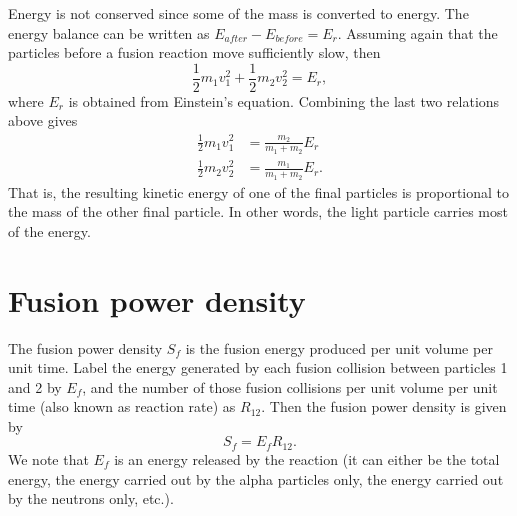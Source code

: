 \documentclass[a4paper,11pt]{report}
\begin{document}
Energy is not conserved since some of the mass is converted to energy. The energy balance can be written as $E_{after} - E_{before} = E_r$. Assuming again that the particles before a fusion reaction move sufficiently slow, then
\begin{equation}
\frac{1}{2} m_1 v_1^2 + \frac{1}{2} m_2 v_2^2 = E_r,
\end{equation}
where $E_r$ is obtained from Einstein's equation. Combining the last two relations above gives
\begin{align}
    \frac{1}{2} m_1 v_1^2 &= \frac{m_2}{m_1 + m_2} E_r \nonumber \\
    \frac{1}{2} m_2 v_2^2 &= \frac{m_1}{m_1 + m_2} E_r.
\end{align}
That is, the resulting kinetic energy of one of the final particles is proportional to the mass of the other final particle. In other words, the light particle carries most of the energy.

\section{Fusion power density}
The fusion power density $S_f$ is the fusion energy produced per unit volume per unit time. Label the energy generated by each fusion collision between particles 1 and 2 by $E_f$, and the number of those fusion collisions per unit volume per unit time (also known as reaction rate) as $R_{12}$. Then the fusion power density is given by 
\begin{equation}
    S_f = E_f R_{12}.
\end{equation}
We note that $E_f$ is an energy released by the reaction (it can either be the total energy, the energy carried out by the alpha particles only, the energy carried out by the neutrons only, etc.). 
\end{document}
